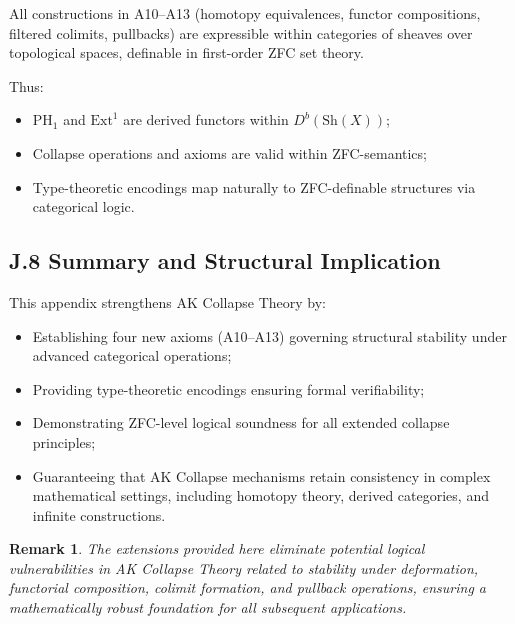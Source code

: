 \documentclass[11pt]{article}
\newtheorem{remark}[theorem]{Remark}
\begin{document}
All constructions in A10–A13 (homotopy equivalences, functor compositions, filtered colimits, pullbacks) are expressible within categories of sheaves over topological spaces, definable in first-order ZFC set theory.

Thus:

\begin{itemize}
    \item \( \mathrm{PH}_1 \) and \( \mathrm{Ext}^1 \) are derived functors within \( D^b(\mathrm{Sh}(X)) \);
    \item Collapse operations and axioms are valid within ZFC-semantics;
    \item Type-theoretic encodings map naturally to ZFC-definable structures via categorical logic.
\end{itemize}

\subsection*{J.8 Summary and Structural Implication}

This appendix strengthens AK Collapse Theory by:

\begin{itemize}
    \item Establishing four new axioms (A10–A13) governing structural stability under advanced categorical operations;
    \item Providing type-theoretic encodings ensuring formal verifiability;
    \item Demonstrating ZFC-level logical soundness for all extended collapse principles;
    \item Guaranteeing that AK Collapse mechanisms retain consistency in complex mathematical settings, including homotopy theory, derived categories, and infinite constructions.
\end{itemize}

\begin{remark}
The extensions provided here eliminate potential logical vulnerabilities in AK Collapse Theory related to stability under deformation, functorial composition, colimit formation, and pullback operations, ensuring a mathematically robust foundation for all subsequent applications.
\end{remark}



\end{document}
